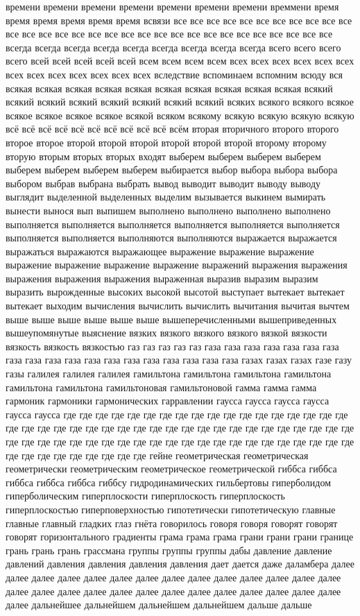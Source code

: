 времени времени времени времени времени времени времени времмени время время время время время время всвязи все все все все все все все все все все все все все все все все все все все все все все все все все все все все все все все всегда всегда всегда всегда всегда всегда всегда всегда всегда всего всего всего всего всей всей всей всей всей всем всем всем всем всех всех всех всех всех всех всех всех всех всех всех всех всех вследствие вспоминаем вспомним всюду вся всякая всякая всякая всякая всякая всякая всякая всякая всякая всякая всякий всякий всякий всякий всякий всякий всякий всякий всяких всякого всякого всякое всякое всякое всякое всякое всякой всяком всякому всякую всякую всякую всякую всё всё всё всё всё всё всё всё всё всё всём вторая вторичного второго второго второе второе второй второй второй второй второй второй второму второму вторую вторым вторых вторых входят выберем выберем выберем выберем выберем выберем выберем выберем выбирается выбор выбора выбора выбора выбором выбрав выбрана выбрать вывод выводит выводит выводу выводу выглядит выделенной выделенных выделим вызывается выкинем вымирать вынести вынося вып выпишем выполнено выполнено выполнено выполнено выполняется выполняется выполняется выполняется выполняется выполняется выполняется выполняется выполняются выполняются выражается выражается выражаться выражаются выражающее выражение выражение выражение выражение выражение выражение выражение выражений выражения выражения выражения выражения выражения выраженная выразив выразим выразим выразить вырожденные высоких высокой высотой выступает вытекает вытекает вытекает выходим вычисления вычислить вычислить вычитания вычитая вычтем выше выше выше выше выше выше вышеперечисленными вышеприведенных вышеупомянутые выяснение вязких вязкого вязкого вязкого вязкой вязкости вязкость вязкость вязкостью газ газ газ газ газ газа газа газа газа газа газа газа газа газа газа газа газа газа газа газа газа газа газа газа газах газах газах газе газу газы галилея галилея галилея гамильтона гамильтона гамильтона гамильтона гамильтона гамильтона гамильтоновая гамильтоновой гамма гамма гамма гармоник гармоники гармонических гарравлении гаусса гаусса гаусса гаусса гаусса гаусса где где где где где где где где где где где где где где где где где где где где где где где где где где где где где где где где где где где где где где где где где где где где где где где где где где где где где где где где где где где где где где где где где где где где где где где гейне геометрическая геометрическая геометрически геометрическим геометрическое геометрической гиббса гиббса гиббса гиббса гиббса гиббсу гидродинамических гильбертовы гиперболидом гиперболическим гиперплоскости гиперплоскость гиперплоскость гиперплоскостью гиперповерхностью гипотетически гипотетическую главные главные главный гладких глаз гнёта говорилось говоря говоря говорят говорят говорят горизонтального градиенты грама грама грама грани грани грани границе грань грань грань грассмана группы группы группы дабы давление давление давлений давления давления давления давления дает дается даже даламбера далее далее далее далее далее далее далее далее далее далее далее далее далее далее далее далее далее далее далее далее далее далее далее далее далее далее далее далее дальнейшее дальнейшем дальнейшем дальнейшем дальше дальше 
